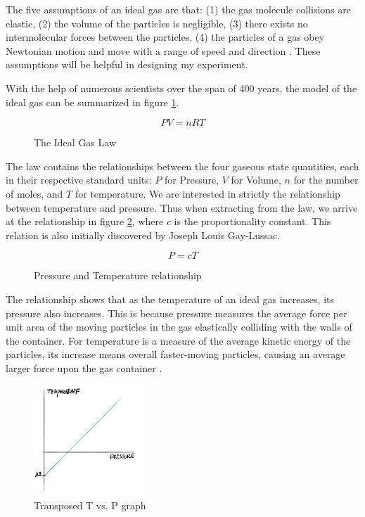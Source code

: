 \documentclass[a4paper,12pt]{article}
\begin{document}
The five assumptions of an ideal gas are that: (1) the gas molecule collisions are elastic, (2) the volume of the particles is negligible, (3) there exists no intermolecular forces between the particles, (4) the particles of a gas obey Newtonian motion and move with a range of speed and direction \parencite{gas_law}. These assumptions will be helpful in designing my experiment.

With the help of numerous scientists over the span of 400 years, the model of the ideal gas can be summarized in figure \ref{fig:igl}.

\begin{figure}[H]
    \[
    PV = nRT
    \]
    \caption{The Ideal Gas Law}
    \label{fig:igl}
\end{figure}

The law contains the relationships between the four gaseous state quantities, each in their respective standard units: $P$ for Pressure, $V$ for Volume, $n$ for the number of moles, and $T$ for temperature. We are interested in strictly the relationship between temperature and pressure. Thus when extracting from the law, we arrive at the relationship in figure \ref{fig:pt}, where $c$ is the proportionality constant. This relation is also initially discovered by Joseph Louis Gay-Lussac.

\begin{figure}[H]
    \[
    P = cT
    \]
    \caption{Pressure and Temperature relationship}
    \label{fig:pt}
\end{figure}

The relationship shows that as the temperature of an ideal gas increases, its pressure also increases. This is because pressure measures the average force per unit area of the moving particles in the gas elastically colliding with the walls of the container. For temperature is a measure of the average kinetic energy of the particles, its increase means overall faster-moving particles, causing an average larger force upon the gas container \parencite{pearson}.



\begin{figure}
    \centering
    \includegraphics[width=0.37\textwidth]{assets/az.png}
    \caption{Transposed T vs. P graph}
    \label{fig:az}
\end{figure}
\end{document}
